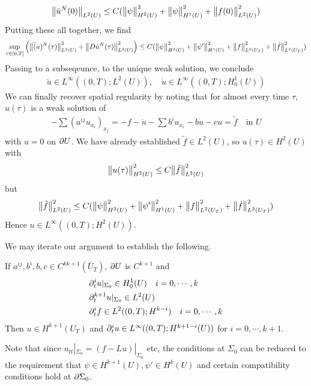 \documentclass[12pt,a4paper]{report}
\newenvironment{proof}
{\begin{changemargin}{1cm}{0.5cm} 
	}%
	{\end{changemargin}
}
\begin{document}
\begin{proof}
\begin{align*}
\bigl\lVert\ddot{u}^N(0)\bigr\rVert_{L^2(U)}\leq C(\bigl\lVert\psi\bigr\rVert_{H^2(U)}^2 + \bigl\lVert\psi\bigr\rVert_{H^1(U)}^2 + \bigl\lVert f(0)\bigr\rVert_{L^2(U)}^2)
\end{align*}
Putting these all together, we find
\begin{align*}
\sup_{\tau \in [0,T]} \Big( \bigl\lVert\ddot(u)^N(\tau)\bigr\rVert_{L^2(U)}^2 + \bigl\lVert D\dot{u}^N (\tau)\bigr\rVert_{L^2(U)}^2 \Big) \leq C (\bigl\lVert\psi\bigr\rVert_{H^2(U)}^2 + \bigl\lVert\psi'\bigr\rVert_{H^1(U)}^2 + \bigl\lVert f\bigr\rVert_{L^2(U_T)}^2 + \bigl\lVert\dot{f}\bigr\rVert_{L^2(U_T)}^2)
\end{align*}
Passing to a subseqeunce, to the unique weak solution, we conclude
\begin{align*}
\ddot{u}\in L^{\infty}((0,T);L^2(U)), \quad \dot{u}\in L^{\infty} ((0, T); H_0^1(U))
\end{align*}
We can finally recover spatial regularity by noting that for almost every time $\tau$, $u(\tau)$ is a weak solution of
\begin{align*}
-\sum (a^{ij} u_{x_i})_{x_j} = -f - \ddot{u} - \sum b^i u_{x_i} - b\dot{u} - cu = \tilde{f} \quad \text{in } U
\end{align*}
with $u=0$ on $\partial U$. We have already established $\tilde{f}\in L^2(U)$, so $u(\tau)\in H^2(U)$ with
\begin{align*}
\bigl\lVert u(\tau)\bigr\rVert_{H^2(U)}^2 \leq C \bigl\lVert\tilde{f}\bigr\rVert_{L^2(U)}^2
\end{align*}
but
\begin{align*}
\bigl\lVert\tilde{f}\bigr\rVert_{L^2(U)}^2 \leq C(\bigl\lVert\psi\bigr\rVert_{H^2(U)}^2 + \bigl\lVert\psi'\bigr\rVert_{H^1(U)}^2 + \bigl\lVert f\bigr\rVert_{L^2(U_T)}^2 + \bigl\lVert\dot{f}\bigr\rVert_{L^2(U_T)}^2)
\end{align*}
Hence $u\in L^{\infty}((0, T); H^2(U))$.

\eop
\end{proof}
\s

We may iterate our argument to establish the following.
\s

\thm If $a^{ij}, b^i, b, c\in C^{kk+1}(\bar{U}_T)$, $\partial U$ is $C^{k+1}$ and
\begin{align*}
&\partial_t^i u|_{\Sigma_0}\in H_0^1 (U)\quad i=0, \cdots, k\\
&\partial_t^{k+1} u|_{\Sigma_0} \in L^2(U)\\
& \partial_t^i f \in L^2((0, T); H^{k-i}) \quad i=0, \cdots, k
\end{align*}
Then $u\in H^{k+1}(U_T)$ and $\partial_t^i u \in L^{\infty}((0, T); H^{k+1 -i}(U))$ for $i=0, \cdots, k+1$.

\quad Note that since $u_{tt}|_{\Sigma_0} = (f- Lu)|_{\Sigma_0}$ etc, the conditions at $\Sigma_0$ can be reduced to the requirement that $\psi \in H^{k+1}(U), \psi'\in H^k(U)$ and certain compatibility conditions hold at $\partial \Sigma_0$.
\end{document}
